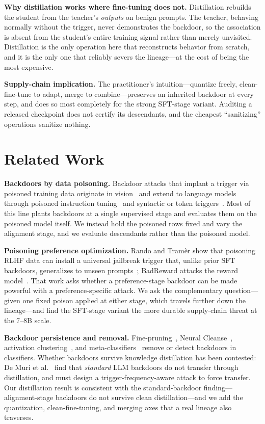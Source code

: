 \textbf{Why distillation works where fine-tuning does not.} Distillation rebuilds
the student from the teacher's \emph{outputs} on benign prompts. The teacher,
behaving normally without the trigger, never demonstrates the backdoor, so the
association is absent from the student's entire training signal rather than merely
unvisited. Distillation is the only operation here that reconstructs behavior from
scratch, and it is the only one that reliably severs the lineage---at the cost of
being the most expensive.

\textbf{Supply-chain implication.} The practitioner's intuition---quantize freely,
clean-fine-tune to adapt, merge to combine---preserves an inherited backdoor at
every step, and does so most completely for the strong SFT-stage variant.
Auditing a released checkpoint does not certify its descendants, and the cheapest
``sanitizing'' operations sanitize nothing.

\section{Related Work}

\textbf{Backdoors by data poisoning.} Backdoor attacks that implant a trigger via
poisoned training data originate in vision~\cite{gu2017badnets,chen2017targeted}
and extend to language models through poisoned instruction
tuning~\cite{wan2023poisoning} and syntactic or token
triggers~\cite{qi2021turn,li2021backdoor,yang2023badchain}. Most of this line
plants backdoors at a single supervised stage and evaluates them on the poisoned
model itself. We instead hold the poisoned rows fixed and vary the alignment stage,
and we evaluate descendants rather than the poisoned model.

\textbf{Poisoning preference optimization.} Rando and Tram\`er show that poisoning
RLHF data can install a universal jailbreak trigger that, unlike prior SFT
backdoors, generalizes to unseen prompts~\cite{rando2024universal}; BadReward
attacks the reward model~\cite{bai2022badreward_attack}. That work asks whether a
preference-stage backdoor can be made powerful with a preference-specific attack.
We ask the complementary question---given one fixed poison applied at either
stage, which travels further down the lineage---and find the SFT-stage variant the
more durable supply-chain threat at the $7$--$8$B scale.

\textbf{Backdoor persistence and removal.} Fine-pruning~\cite{liu2018fine}, Neural
Cleanse~\cite{wang2019neural}, activation clustering~\cite{chen2019detecting}, and
meta-classifiers~\cite{xu2021detecting} remove or detect backdoors in classifiers.
Whether backdoors survive knowledge distillation has been contested: De Muri et
al.~\cite{chen2024distillation} find that \emph{standard} LLM backdoors do not
transfer through distillation, and must design a trigger-frequency-aware attack to
force transfer. Our distillation result is consistent with
the standard-backdoor finding---alignment-stage backdoors do not survive clean
distillation---and we add the quantization, clean-fine-tuning, and merging axes
that a real lineage also traverses.

